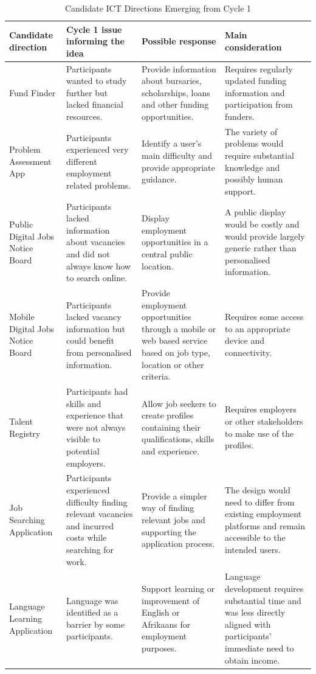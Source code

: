 \begin{table}[htbp]
\centering
\caption{Candidate ICT Directions Emerging from Cycle 1}
\label{tab:cycle1_ict_directions}
\scriptsize
\renewcommand{\arraystretch}{1.18}
\begin{tabular}{p{2.8cm} p{4.3cm} p{4.4cm} p{3.5cm}}
\hline
\textbf{Candidate direction} &
\textbf{Cycle 1 issue informing the idea} &
\textbf{Possible response} &
\textbf{Main consideration} \\
\hline

Fund Finder &
Participants wanted to study further but lacked financial resources. &
Provide information about bursaries, scholarships, loans and other funding opportunities. &
Requires regularly updated funding information and participation from funders. \\

Problem Assessment App &
Participants experienced very different employment related problems. &
Identify a user's main difficulty and provide appropriate guidance. &
The variety of problems would require substantial knowledge and possibly human support. \\

Public Digital Jobs Notice Board &
Participants lacked information about vacancies and did not always know how to search online. &
Display employment opportunities in a central public location. &
A public display would be costly and would provide largely generic rather than personalised information. \\

Mobile Digital Jobs Notice Board &
Participants lacked vacancy information but could benefit from personalised information. &
Provide employment opportunities through a mobile or web based service based on job type, location or other criteria. &
Requires some access to an appropriate device and connectivity. \\

Talent Registry &
Participants had skills and experience that were not always visible to potential employers. &
Allow job seekers to create profiles containing their qualifications, skills and experience. &
Requires employers or other stakeholders to make use of the profiles. \\

Job Searching Application &
Participants experienced difficulty finding relevant vacancies and incurred costs while searching for work. &
Provide a simpler way of finding relevant jobs and supporting the application process. &
The design would need to differ from existing employment platforms and remain accessible to the intended users. \\

Language Learning Application &
Language was identified as a barrier by some participants. &
Support learning or improvement of English or Afrikaans for employment purposes. &
Language development requires substantial time and was less directly aligned with participants' immediate need to obtain income. \\

\hline
\end{tabular}
\end{table}

